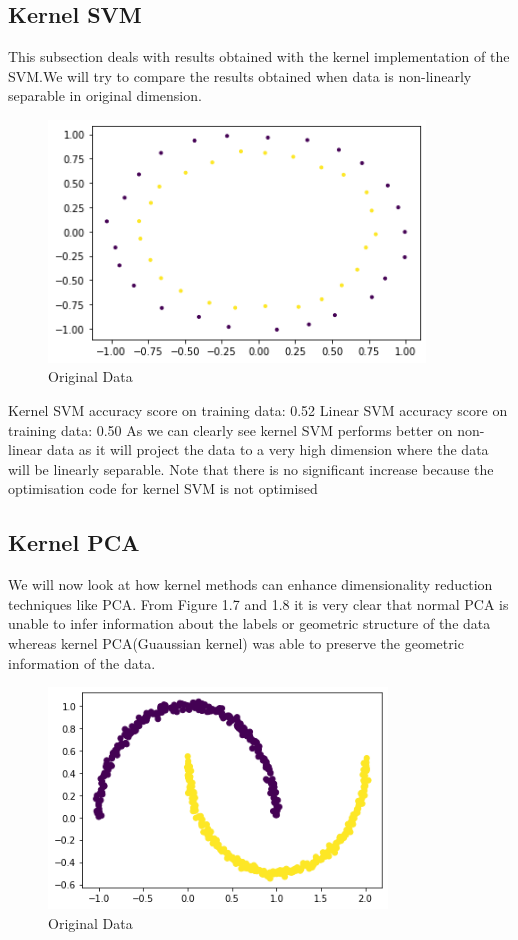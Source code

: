 \documentclass[../main.tex]{subfiles}
\begin{document}
\subsection{Kernel SVM}
This subsection deals with results obtained with the kernel implementation of the SVM.We will try to compare the results obtained when data is non-linearly separable in original dimension.

    \begin{figure}[htp]
    \centering
    \includegraphics[width=10cm]{H12.png}
    \caption{Original Data}
    \label{Original Data}
    \end{figure}

Kernel SVM accuracy score on training data: 0.52
\newline
Linear SVM accuracy score on training data: 0.50
\newline
As we can clearly see kernel SVM performs better on non-linear data as it will project the data to a very high dimension where the data will be linearly separable. Note that there is no significant increase because the optimisation code for kernel SVM is not optimised

\subsection{Kernel PCA}
We will now look at how kernel methods can enhance dimensionality reduction techniques like PCA.
\newline
From Figure 1.7 and 1.8 it is very clear that normal PCA is unable to infer information about the labels or geometric structure of the data whereas kernel PCA(Guaussian kernel) was able to preserve the geometric information of the data.
    


    \begin{figure}[htp]
    \centering
    \includegraphics[width=9cm]{H10.png}
    \caption{Original Data}
    \label{Original Data}
    \end{figure}
    
\end{document}
